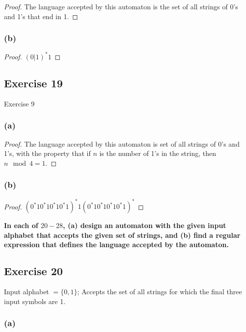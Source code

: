 \documentclass[14pt]{extarticle}
\newcommand{\cy}{\color{cyan}}
\begin{document}
\begin{proof}
    The language accepted by this automaton is the set of all strings of 0’s and 1’s that end in 1.
\end{proof}

\subsubsection{(b)}

\begin{proof}
    \((0 | 1)^*1\)
\end{proof}

\subsection{Exercise 19}
Exercise 9
\subsubsection{(a)}

\begin{proof}
    The language accepted by this automaton is set of all strings of 0’s and 1’s, with the property that if \(n\) is the number
    of 1's in the string, then \(n \mod 4 = 1\).
\end{proof}

\subsubsection{(b)}

\begin{proof}
    \((0^*10^*10^*10^*1)^*1(0^*10^*10^*10^*1)^*\)
\end{proof}

{\bf \cy In each of \(20-28\), (a) design an automaton with the given input alphabet that accepts the given set of
strings, and (b) find a regular expression that defines the language accepted by the automaton.}

\subsection{Exercise 20}
Input alphabet \(= \{0, 1\}\); Accepts the set of all strings for which the final three input symbols are 1.

\subsubsection{(a)}
\end{document}

